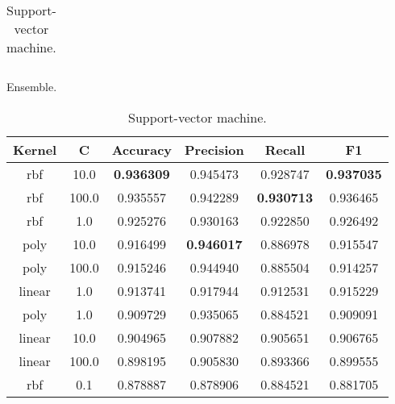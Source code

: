\begin{appendices}
\begin{table}[ht]
\begin{subtable}{\textwidth}
\begin{adjustbox}{minipage=18cm, center}
\begin{tabular*}{\textwidth}{c @{\extracolsep{\fill}} cccccccc}
\end{tabular*}
\caption{\label{tab:Ensemble}Ensemble.}
\end{adjustbox}
\end{subtable}


\bigskip
\begin{subtable}{\textwidth}
\begin{adjustbox}{minipage=18cm, center}
\centering
\begin{tabular*}{\textwidth}{c @{\extracolsep{\fill}} ccccc}
\toprule
 Kernel &      C &  Accuracy &  Precision &    Recall &        F1 \\
\midrule
    rbf &   10.0 & \textbf{0.936309} &   0.945473 &  0.928747 &  \textbf{0.937035} \\
    rbf &  100.0 &  0.935557 &   0.942289 &  \textbf{0.930713} &  0.936465 \\
    rbf &    1.0 &  0.925276 &   0.930163 &  0.922850 &  0.926492 \\
   poly &   10.0 &  0.916499 &   \textbf{0.946017} &  0.886978 &  0.915547 \\
   poly &  100.0 &  0.915246 &   0.944940 &  0.885504 &  0.914257 \\
 linear &    1.0 &  0.913741 &   0.917944 &  0.912531 &  0.915229 \\
   poly &    1.0 &  0.909729 &   0.935065 &  0.884521 &  0.909091 \\
 linear &   10.0 &  0.904965 &   0.907882 &  0.905651 &  0.906765 \\
 linear &  100.0 &  0.898195 &   0.905830 &  0.893366 &  0.899555 \\
    rbf &    0.1 &  0.878887 &   0.878906 &  0.884521 &  0.881705 \\
\bottomrule
\end{tabular*}
\caption{\label{tab:Support-vector machine}Support-vector machine.}
\end{adjustbox}
\end{subtable}



\end{table}
\end{appendices}
